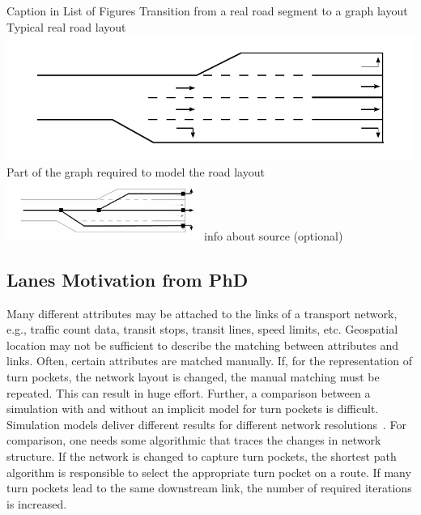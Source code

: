 \createfigure%
{Caption in List of Figures}%
{Transition from a real road segment to a graph layout}
{\label{fig:combined_model}}
{%
  \createsubfigure%
	{Typical real road layout}
	{\includegraphics[width=0.475\linewidth]{extending/figures/signalslanes/real_road_layout.pdf}}
	{\label{fig:real_road_layout}}
  \createsubfigure%
	{Part of the graph required to model the road layout}
	{\includegraphics[width=0.475\textwidth]{extending/figures/signalslanes/link_lanes_layout}}
	{\label{fig:model_link_layout}}
}%
{info about source (optional)}


\subsection{Lanes Motivation from PhD}
Many different attributes may be attached to the links of a transport network, e.g., traffic count data, transit stops, transit lines, speed limits, etc. 
Geospatial location may not be sufficient to describe the matching between attributes and links. 
Often, certain attributes are matched manually. 
If, for the representation of turn pockets, the network layout is changed, the manual matching must be repeated. 
This can result in huge effort. 
Further, a comparison between a simulation with and without an implicit model for turn pockets is difficult. 
Simulation models deliver different results for different network resolutions~\citep[][p.~38]{GawronPhd}.  
For comparison, one needs some algorithmic that traces the changes in network structure.  
If the network is changed to capture turn pockets, the shortest path algorithm is responsible to select the appropriate turn pocket on a route. 
If many turn pockets lead to the same downstream link, the number of required iterations is increased. 

